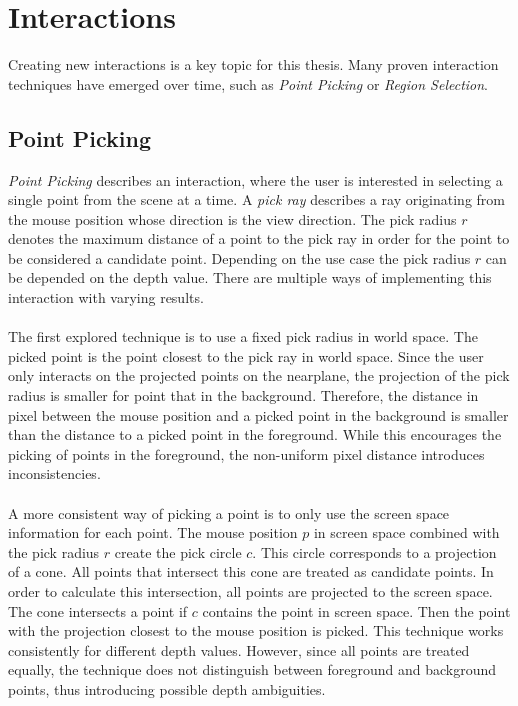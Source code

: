 \chapter{Interactions}

Creating new interactions is a key topic for this thesis. Many proven interaction techniques have emerged over time, such as \textit{Point Picking} or \textit{Region Selection}. 
\section{Point Picking}

\textit{Point Picking} describes an interaction, where the user is interested in selecting a single point from the scene at a time. A \textit{pick ray} describes a ray originating from the mouse position whose direction is the view direction. The pick radius $r$ denotes the maximum distance of a point to the pick ray in order for the point to be considered a candidate point. Depending on the use case the pick radius $r$ can be depended on the depth value. There are multiple ways of implementing this interaction with varying results. 
\\
\\
The first explored technique is to use a fixed pick radius in world space. The picked point is the point closest to the pick ray in world space. Since the user only interacts on the projected points on the nearplane, the projection of the pick radius is smaller for point that in the background. Therefore, the distance in pixel between the mouse position and a picked point in the background is smaller than the distance to a picked point in the foreground. While this encourages the picking of points in the foreground, the non-uniform pixel distance introduces inconsistencies. 
\\
\\
A more consistent way of picking a point is to only use the screen space information for each point. The mouse position $p$ in screen space combined with the pick radius $r$ create the pick circle $c$. This circle corresponds to a projection of a cone. All points that intersect this cone are treated as candidate points. In order to calculate this intersection, all points are projected to the screen space. The cone intersects a point if $c$ contains the point in screen space. Then the point with the projection closest to the mouse position is picked. This technique works consistently for different depth values. However, since all points are treated equally, the technique does not distinguish between foreground and background points, thus introducing possible depth ambiguities. 
